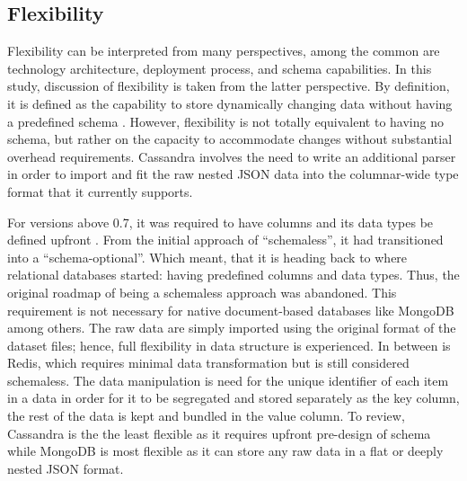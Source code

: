 \documentclass[5p]{elsarticle}
\begin{document}
\begin{figure}[h]
{           \label{performance.workloadc}
         }
\end{figure}




\subsection{Flexibility}
Flexibility can be interpreted from many perspectives, among the common are technology architecture, deployment process, and schema capabilities. 
In this study, discussion of flexibility is taken from the latter perspective. 
By definition, it is defined as the capability to store dynamically changing data without having a predefined schema \cite{O.Schmitt20121,Z.Goli-Malekabadi201675}. 
However, flexibility is not totally equivalent to having no schema, but rather on the capacity to accommodate changes without substantial overhead requirements. 
Cassandra involves the need to write an additional parser in order to import and fit the raw nested JSON data into the columnar-wide type format that it currently supports.

For versions above 0.7, it was required to have columns and its data types be defined upfront \cite{J.Ellis2018}. From the initial approach of “schemaless”, 
it had transitioned into a “schema-optional”. Which meant, that it is heading back to where relational databases started: having predefined columns and data types. 
Thus, the original roadmap of being a schemaless approach was abandoned. This requirement is not necessary for native document-based databases like MongoDB among others. 
The raw data are simply imported using the original format of the dataset files; hence, full flexibility in data structure is experienced. 
In between is Redis, which requires minimal data transformation but is still considered schemaless. 
The data manipulation is need for the unique identifier of each item in a data in order for it to be segregated and stored separately as the key column,
the rest of the data is kept and bundled in the value column. To review, Cassandra is the the least flexible as it requires upfront pre-design of schema while MongoDB is most 
flexible as it can store any raw data in a flat or deeply nested JSON format.
\end{document}
